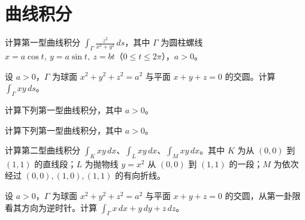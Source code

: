 \renewcommand{\thesection}{\arabic{section}}\renewcommand{\theHsection}{chapter.\arabic{section}}\setcounter{section}{10}\section{曲线积分}
\noindent\begin{minipage}{\textwidth}
计算第一型曲线积分 $\displaystyle\int_\Gamma\frac{z^2}{x^2+y^2}\,ds$，其中 $\Gamma$ 为圆柱螺线 $x=a\cos t,\ y=a\sin t,\ z=bt$（$0\le t\le2\pi$），$a>0$。
\end{minipage}\par\vfill
\noindent\begin{minipage}{\textwidth}
设 $a>0$，$\Gamma$ 为球面 $x^2+y^2+z^2=a^2$ 与平面 $x+y+z=0$ 的交圆。计算 $\int_\Gamma xy\,ds$。
\end{minipage}\par\vfill
\noindent\begin{minipage}{\textwidth}
计算下列第一型曲线积分，其中 $a>0$。
\end{minipage}\par\vfill
\newpage
\noindent\begin{minipage}{\textwidth}
计算下列第一型曲线积分，其中 $a>0$。
\end{minipage}\par\vfill
\noindent\begin{minipage}{\textwidth}
计算第二型曲线积分 $\int_Kxy\,dx$、$\int_Lxy\,dx$、$\int_Mxy\,dx$。其中 $K$ 为从 $(0,0)$ 到 $(1,1)$ 的直线段；$L$ 为抛物线 $y=x^2$ 从 $(0,0)$ 到 $(1,1)$ 的一段；$M$ 为依次经过 $(0,0),(1,0),(1,1)$ 的有向折线。
\end{minipage}\par\vfill
\noindent\begin{minipage}{\textwidth}
设 $a>0$，$\Gamma$ 为球面 $x^2+y^2+z^2=a^2$ 与平面 $x+y+z=0$ 的交圆，从第一卦限看其方向为逆时针。计算 $\int_\Gamma x\,dx+y\,dy+z\,dz$。
\end{minipage}\par\vfill

